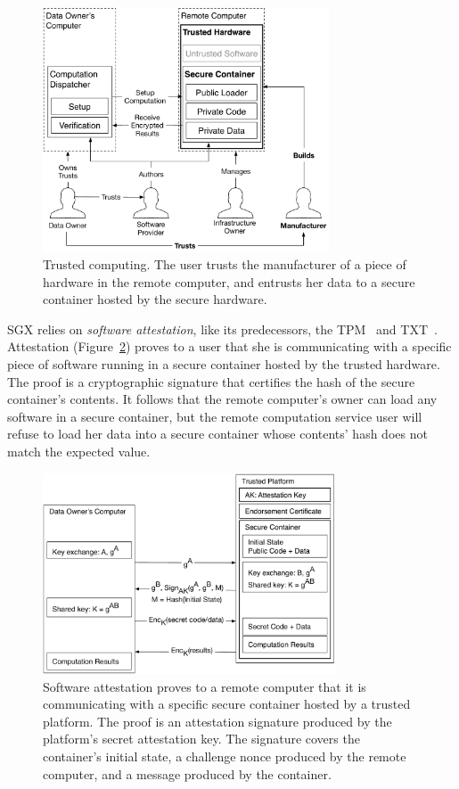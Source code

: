 \begin{figure}[hbt]
  \centering
  \includegraphics[width=85mm]{figures/trusted_computing.pdf}
  \caption{
    Trusted computing. The user trusts the manufacturer of a piece of hardware
    in the remote computer, and entrusts her data to a secure container hosted
    by the secure hardware.
  }
  \label{fig:trusted_computing}
\end{figure}

SGX relies on \textit{software attestation}, like its predecessors, the
TPM~\cite{grawrock2003tpm} and TXT~\cite{grawrock2009txt}. Attestation
(Figure~\ref{fig:generic_attestation}) proves to a user that she is
communicating with a specific piece of software running in a secure container
hosted by the trusted hardware. The proof is a cryptographic signature that
certifies the hash of the secure container's contents. It follows that the
remote computer's owner can load any software in a secure container, but the
remote computation service user will refuse to load her data into a secure
container whose contents' hash does not match the expected value.

\begin{figure}[hbt]
  \centering
  \includegraphics[width=87mm]{figures/generic_attestation.pdf}
  \caption{
    Software attestation proves to a remote computer that it is communicating
    with a specific secure container hosted by a trusted platform. The proof is
    an attestation signature produced by the platform's secret attestation key.
    The signature covers the container's initial state, a challenge nonce
    produced by the remote computer, and a message produced by the container.
  }
  \label{fig:generic_attestation}
\end{figure}

